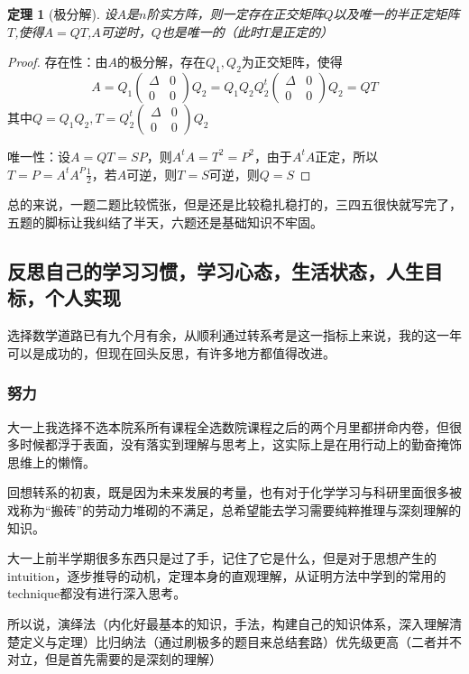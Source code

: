 \documentclass[12pt, a4paper, oneside]{ctexart}
\newtheorem{theorem}{定理}[section]
\begin{document}
\begin{theorem}[极分解]
    设$A$是$n$阶实方阵，则一定存在正交矩阵$Q$以及唯一的半正定矩阵$T$,使得$A=QT$,$A$可逆时，$Q$也是唯一的（此时$T$是正定的）
\end{theorem}
\begin{proof}
    存在性：由$A$的极分解，存在$Q_1,Q_2$为正交矩阵，使得
    $$ A=Q_1 \begin{pmatrix} \Delta  & 0 \\ 0 & 0 \end{pmatrix} Q_2=Q_1 Q_2 Q_2^{t}\begin{pmatrix} \Delta  & 0 \\ 0 & 0 \end{pmatrix}Q_2=QT$$
    其中$Q=Q_1 Q_2,T=Q_2^{t}\begin{pmatrix} \Delta  & 0 \\ 0 & 0 \end{pmatrix}Q_2$
    
    唯一性：设$A=QT=SP$，则$A^tA=T^2=P^2$，由于$A^tA$正定，所以$T=P=A^tA^P{\frac{1}{2}}$，若$A$可逆，则$T=S$可逆，则$Q=S$
\end{proof} 

总的来说，一题二题比较慌张，但是还是比较稳扎稳打的，三四五很快就写完了，五题的脚标让我纠结了半天，六题还是基础知识不牢固。

\subsection{反思自己的学习习惯，学习心态，生活状态，人生目标，个人实现}

选择数学道路已有九个月有余，从顺利通过转系考是这一指标上来说，我的这一年可以是成功的，但现在回头反思，有许多地方都值得改进。

\subsubsection{努力}
大一上我选择不选本院系所有课程全选数院课程之后的两个月里都拼命内卷，但很多时候都浮于表面，没有落实到理解与思考上，这实际上是在用行动上的勤奋掩饰思维上的懒惰。

回想转系的初衷，既是因为未来发展的考量，也有对于化学学习与科研里面很多被戏称为“搬砖”的劳动力堆砌的不满足，总希望能去学习需要纯粹推理与深刻理解的知识。

大一上前半学期很多东西只是过了手，记住了它是什么，但是对于思想产生的intuition，逐步推导的动机，定理本身的直观理解，从证明方法中学到的常用的technique都没有进行深入思考。

所以说，演绎法（内化好最基本的知识，手法，构建自己的知识体系，深入理解清楚定义与定理）比归纳法（通过刷极多的题目来总结套路）优先级更高（二者并不对立，但是首先需要的是深刻的理解）
\end{document}
